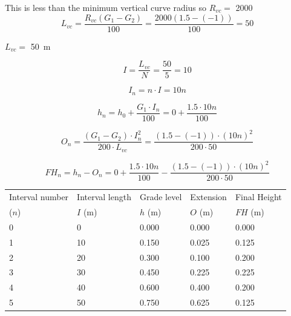 \documentclass{bcrre_exam}
\begin{document}
\begin{questions}
\begin{solution}
This is less than the minimum vertical curve radius so $R_{vc}=$ \qty{2000}.

\begin{equation}
    L_{vc} = \frac{R_{vc}(G_1-G_2)}{100}=\frac{2000(1.5-(-1))}{100}=50
\end{equation}

$L_{vc}=$ \qty{50}{m}

\begin{equation}
    I = \frac{L_{vc}}{N} = \frac{50}{5} = 10
\end{equation}

\begin{equation}
    I_n = n \cdot I = 10n
\end{equation}

\begin{equation}
    h_n = h_0 + \frac{G_1 \cdot I_n}{100}=0+\frac{1.5 \cdot 10n}{100}
\end{equation}

\begin{equation}
    O_n = \frac{(G_1-G_2) \cdot I_n^2}{200 \cdot L_{vc}} = \frac{(1.5-(-1))\cdot (10n)^2}{200 \cdot 50}
\end{equation}

\begin{equation}
    FH_n = h_n - O_n = 0+\frac{1.5 \cdot 10n}{100} - \frac{(1.5-(-1))\cdot (10n)^2}{200 \cdot 50}
\end{equation}

\vspace{1cm}

\begin{tabular}{@{}lllll@{}}
\toprule
Interval number & Interval length & Grade level & Extension & Final Height \\
($n$) & $I$ (\unit{m}) & $h$ (\unit{m}) & $O$ (\unit{m}) & $FH$ (\unit{m}) \\
\midrule
\num{0} & \num{0}  & \num{0.000} & \num{0.000} & \num{0.000} \\
\num{1} & \num{10} & \num{0.150} & \num{0.025} & \num{0.125} \\
\num{2} & \num{20} & \num{0.300} & \num{0.100} & \num{0.200} \\
\num{3} & \num{30} & \num{0.450} & \num{0.225} & \num{0.225} \\
\num{4} & \num{40} & \num{0.600} & \num{0.400} & \num{0.200} \\
\num{5} & \num{50} & \num{0.750} & \num{0.625} & \num{0.125} \\ \bottomrule
\end{tabular}

\end{solution}

\end{questions}
\end{document}
